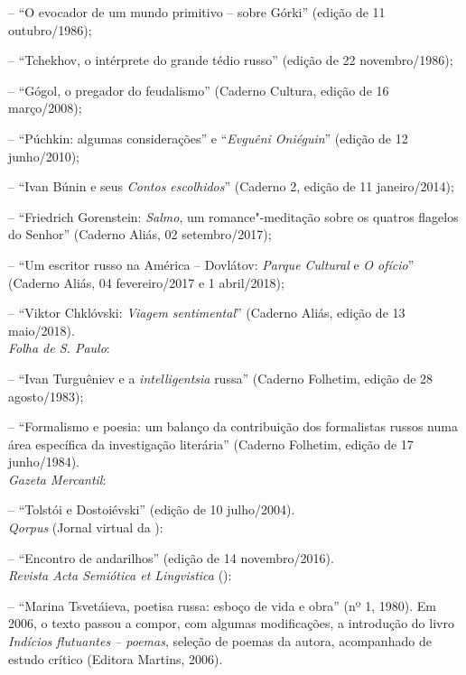 \noindent{}-- ``O evocador de um mundo primitivo -- sobre Górki'' (edição de 11 outubro/1986);

\noindent{}-- ``Tchekhov, o intérprete do grande tédio russo'' (edição de 22 novembro/1986); 

\noindent{}-- ``Gógol, o pregador do feudalismo'' (Caderno Cultura, edição de 16 março/2008); 

\noindent{}-- ``Púchkin: algumas considerações'' e ``\emph{Evguêni Oniéguin}'' (edição de 12 junho/2010); 

\noindent{}-- ``Ivan Búnin e seus \emph{Contos escolhidos}'' (Caderno 2, edição de 11 janeiro/2014); 

\noindent{}-- ``Friedrich Gorenstein: \emph{Salmo}, um romance"-meditação sobre os quatros flagelos do Senhor'' (Caderno Aliás, 02 setembro/2017); 

\noindent{}-- ``Um escritor russo na América -- Dovlátov: \emph{Parque Cultural} e \emph{O ofício}'' (Caderno Aliás, 04 fevereiro/2017 e 1 abril/2018); 

\noindent{}-- ``Viktor Chklóvski: \emph{Viagem sentimental}'' (Caderno Aliás, edição de 13 maio/2018). \\

\noindent{}\emph{Folha de S. Paulo}:

\noindent{}-- ``Ivan Turguêniev e a \emph{intelligentsia} russa'' (Caderno Folhetim, edição de 28 agosto/1983);

\noindent{}-- ``Formalismo e poesia: um balanço da contribuição dos formalistas russos numa
área específica da investigação literária'' (Caderno Folhetim, edição de 17 junho/1984). \\

\noindent{}\emph{Gazeta Mercantil}:

\noindent{}-- ``Tolstói e Dostoiévski'' (edição de 10 julho/2004). \\

\noindent{}\emph{Qorpus} (Jornal virtual da ):

\noindent{}-- ``Encontro de andarilhos'' (edição de 14 novembro/2016). \\

\noindent{}\emph{Revista Acta Semiótica et Lingvistica} ():

\noindent{}-- ``Marina Tsvetáieva, poetisa russa: esboço de vida e obra'' (nº 1, 1980). Em 2006, o texto passou a compor, com algumas modificações, a introdução do livro \emph{Indícios flutuantes -- poemas}, seleção de poemas da autora, acompanhado de estudo crítico (Editora Martins, 2006). \\

